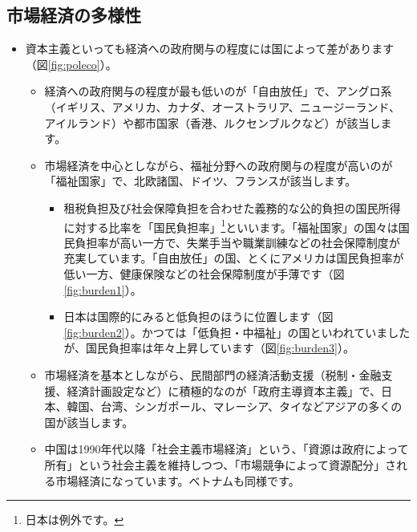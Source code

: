 \documentclass[
]{book}
\begin{document}
\hypertarget{market_economy}{%
\subsection{市場経済の多様性}\label{market_economy}}

\begin{itemize}
\item
  資本主義といっても経済への政府関与の程度には国によって差があります（図\ref{fig:poleco}）。

  \begin{itemize}
  \item
    経済への政府関与の程度が最も低いのが「自由放任」で、アングロ系（イギリス、アメリカ、カナダ、オーストラリア、ニュージーランド、アイルランド）や都市国家（香港、ルクセンブルクなど）が該当します。
  \item
    市場経済を中心としながら、福祉分野への政府関与の程度が高いのが「福祉国家」で、北欧諸国、ドイツ、フランスが該当します。

    \begin{itemize}
    \item
      租税負担及び社会保障負担を合わせた義務的な公的負担の国民所得に対する比率を「国民負担率」\footnote{日本は例外です。}といいます。「福祉国家」の国々は国民負担率が高い一方で、失業手当や職業訓練などの社会保障制度が充実しています。「自由放任」の国、とくにアメリカは国民負担率が低い一方、健康保険などの社会保障制度が手薄です（図\ref{fig:burden1}）。
    \item
      日本は国際的にみると低負担のほうに位置します（図\ref{fig:burden2}）。かつては「低負担・中福祉」の国といわれていましたが、国民負担率は年々上昇しています（図\ref{fig:burden3}）。
    \end{itemize}
  \item
    市場経済を基本としながら、民間部門の経済活動支援（税制・金融支援、経済計画設定など）に積極的なのが「政府主導資本主義」で、日本、韓国、台湾、シンガポール、マレーシア、タイなどアジアの多くの国が該当します。
  \item
    中国は1990年代以降「社会主義市場経済」という、「資源は政府によって所有」という社会主義を維持しつつ、「市場競争によって資源配分」される市場経済になっています。ベトナムも同様です。
  \end{itemize}
\end{itemize}
\end{document}
